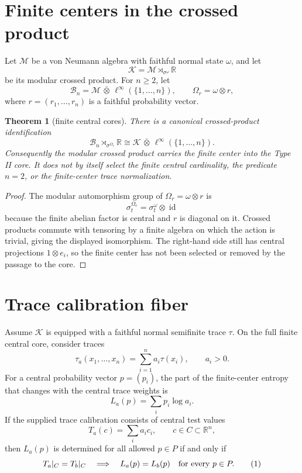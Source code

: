 \documentclass[12pt]{article}
\newtheorem{theorem}{Theorem}
\theoremstyle{remark}
\newcommand{\B}{\mathcal B}
\newcommand{\K}{\mathcal K}
\newcommand{\M}{\mathcal M}
\newcommand{\R}{\mathbb R}
\newcommand{\id}{\operatorname{id}}
\begin{document}
\section{Finite centers in the crossed product}

Let \(\M\) be a von Neumann algebra with faithful normal state \(\omega\), and
let
\[
  \K=\M\rtimes_{\sigma^\omega}\R
\]
be its modular crossed product.  For \(n\ge2\), let
\[
  \B_n=\M\,\bar\otimes\,\ell^\infty(\{1,\ldots,n\}),
  \qquad
  \Omega_r=\omega\otimes r,
\]
where \(r=(r_1,\ldots,r_n)\) is a faithful probability vector.

\begin{theorem}[finite central cores]
\label{thm:finite-central-cores}
There is a canonical crossed-product identification
\[
  \B_n\rtimes_{\sigma^{\Omega_r}}\R
  \cong
  \K\,\bar\otimes\,\ell^\infty(\{1,\ldots,n\}).
\]
Consequently the modular crossed product carries the finite center into the
Type II core.  It does not by itself select the finite central cardinality,
the predicate \(n=2\), or the finite-center trace normalization.
\end{theorem}

\begin{proof}
The modular automorphism group of \(\Omega_r=\omega\otimes r\) is
\[
  \sigma_t^{\Omega_r}=\sigma_t^\omega\otimes\id
\]
because the finite abelian factor is central and \(r\) is diagonal on it.
Crossed products commute with tensoring by a finite algebra on which the
action is trivial, giving the displayed isomorphism.  The right-hand side
still has central projections \(1\otimes e_i\), so the finite center has not
been selected or removed by the passage to the core.
\end{proof}

\section{Trace calibration fiber}

Assume \(\K\) is equipped with a faithful normal semifinite trace \(\tau\).
On the full finite central core, consider traces
\[
  \tau_a(x_1,\ldots,x_n)=\sum_{i=1}^n a_i\tau(x_i),
  \qquad a_i>0.
\]
For a central probability vector \(p=(p_i)\), the part of the finite-center
entropy that changes with the central trace weights is
\[
  L_a(p)=\sum_i p_i\log a_i.
\]
If the supplied trace calibration consists of central test values
\[
  T_a(c)=\sum_i a_i c_i,\qquad c\in C\subset\R^n,
\]
then \(L_a(p)\) is determined for all allowed \(p\in P\) if and only if
\[
  T_a|_C=T_b|_C
  \quad\Longrightarrow\quad
  L_a(p)=L_b(p)\quad\hbox{for every }p\in P .
  \tag{1}
\]
\end{document}
